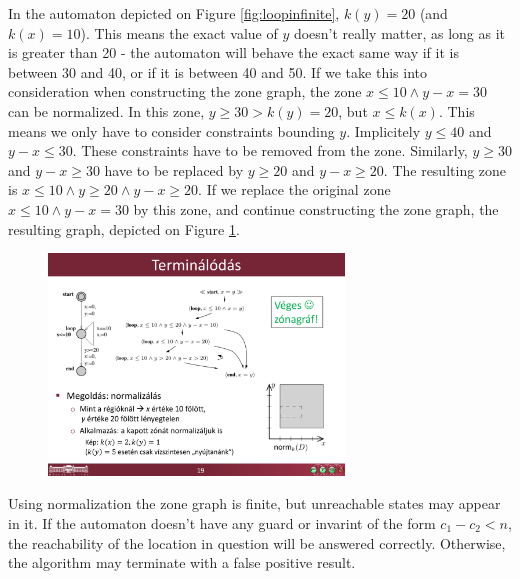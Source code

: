 \begin{example}
In the automaton depicted on Figure \ref{fig:loopinfinite}, $k(y)=20$ (and $k(x)=10$). This means the exact value of $y$ doesn't really matter, as long as it is greater than 20 - the automaton will behave the exact same way if it is between 30 and 40, or if it is between 40 and 50. %
If we take this into consideration when constructing the zone graph, the zone  $x \leq 10 \wedge y-x=30$ can be normalized. In this zone, $y \geq 30 > k(y)=20$, but $x \leq k(x)$. This means we only have to consider constraints bounding $y$.
Implicitely $y \leq 40$ and $y-x \leq 30$. These constraints have to be removed from the zone. Similarly, $y \geq 30$ and $y-x \geq 30$ have to be replaced by $y \geq 20$ and $y-x \geq 20$. The resulting zone is $x \leq 10 \wedge y \geq 20 \wedge y-x \geq 20$. If we replace the original zone  $x \leq 10 \wedge y-x=30$ by this zone, and continue constructing the zone graph, the resulting graph, depicted on Figure \ref{fig:looprealgraph}.

\end{example}

\begin{figure}
	\includegraphics [width=0.7\textwidth] {include/figures/loop_real_zonegraph}%
	\label{fig:looprealgraph}
\end{figure}

Using normalization the zone graph is finite, but unreachable states may appear in it. If the automaton doesn't have any guard or invarint of the form $c_1 - c_2 < n$, the reachability of the location in question will be answered correctly. Otherwise, the algorithm may terminate with a false positive result.

